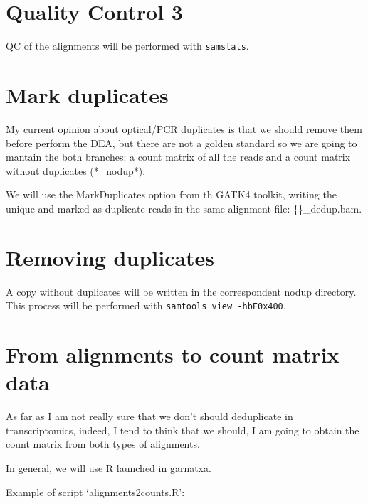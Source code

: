 \documentclass[
]{book}
\begin{document}
\hypertarget{quality-control-3}{%
\section{Quality Control 3}\label{quality-control-3}}

QC of the alignments will be performed with \texttt{samstats}.

\hypertarget{mark-duplicates}{%
\section{Mark duplicates}\label{mark-duplicates}}

My current opinion about optical/PCR duplicates is that we should remove them before perform the DEA, but there are not a golden standard so we are going to mantain the both branches: a count matrix of all the reads and a count matrix without duplicates (*\_nodup*).

We will use the MarkDuplicates option from th GATK4 toolkit, writing the unique and marked as duplicate reads in the same alignment file: \{\}\_dedup.bam.

\hypertarget{removing-duplicates}{%
\section{Removing duplicates}\label{removing-duplicates}}

A copy without duplicates will be written in the correspondent nodup directory. This process will be performed with \texttt{samtools\ view\ -hbF0x400}.

\hypertarget{from-alignments-to-count-matrix-data}{%
\section{From alignments to count matrix data}\label{from-alignments-to-count-matrix-data}}

As far as I am not really sure that we don't should deduplicate in transcriptomics, indeed, I tend to think that we should, I am going to obtain the count matrix from both types of alignments.

In general, we will use R launched in garnatxa.

Example of script `alignments2counts.R':
\end{document}
